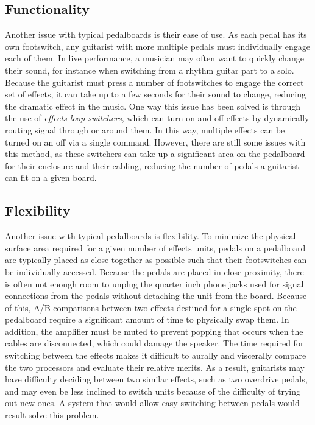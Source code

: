 \documentclass{article}
\begin{document}
\subsection{Functionality}

Another issue with typical pedalboards is their ease of use.  As each pedal has its own footswitch, any guitarist with more multiple pedals must individually engage each of them.  In live performance, a musician may often want to quickly change their sound, for instance when switching from a rhythm guitar part to a solo.  Because the guitarist must press a number of footswitches to engage the correct set of effects, it can take up to a few seconds for their sound to change, reducing the dramatic effect in the music.  One way this issue has been solved is through the use of \emph{effects-loop switchers}, which can turn on and off effects by dynamically routing signal through or around them.  In this way, multiple effects can be turned on an off via a single command.  However, there are still some issues with this method, as these switchers can take up a significant area on the pedalboard for their enclosure and their cabling, reducing the number of pedals a guitarist can fit on a given board.

\subsection{Flexibility}

Another issue with typical pedalboards is flexibility.  To minimize the physical surface area required for a given number of effects units, pedals on a pedalboard are typically placed as close together as possible such that their footswitches can be individually accessed.  Because the pedals are placed in close proximity, there is often not enough room to unplug the quarter inch phone jacks used for signal connections from the pedals without detaching the unit from the board.  Because of this, A/B comparisons between two effects destined for a single spot on the pedalboard require a significant amount of time to physically swap them.  In addition, the amplifier must be muted to prevent popping that occurs when the cables are disconnected, which could damage the speaker.  The time required for switching between the effects makes it difficult to aurally and viscerally compare the two processors and evaluate their relative merits.  As a result, guitarists may have difficulty deciding between two similar effects, such as two overdrive pedals, and may even be less inclined to switch units because of the difficulty of trying out new ones.  A system that would allow easy switching between pedals would result solve this problem.
\end{document}
